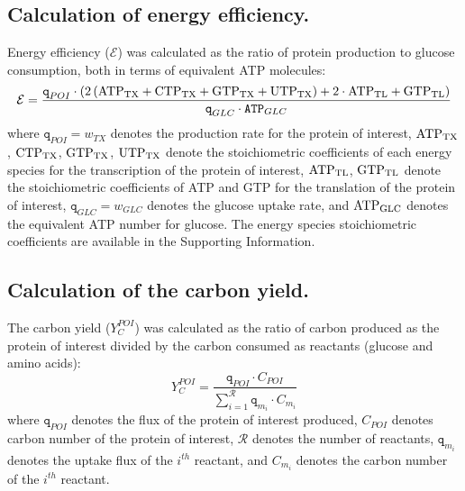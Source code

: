 \documentclass[journal=asbcd6,manuscript=article]{achemso}
\begin{document}
\clearpage

\subsection*{Calculation of energy efficiency.}
Energy efficiency ($\mathcal{E}$) was calculated as the ratio of protein production to glucose consumption, both in terms of equivalent ATP molecules:
\begin{equation}\label{eqn:energy-efficiency-definition}
	\mathcal{E}=\frac{\texttt{q}_{POI}\cdot \left(2\left(\rm {ATP}_{TX}+\rm {CTP}_{TX}+\rm {GTP}_{TX}+\rm {UTP}_{TX}\right)+\rm2\cdot\rm {ATP}_{TL}+\rm {GTP}_{TL}\right)}{\texttt{q}_{GLC}\cdot\texttt{ATP}_{GLC}}
\end{equation}
where $\texttt{q}_{POI}=w_{TX}$ denotes the production rate for the protein of interest, $\rm {ATP}_{TX}$, $\rm {CTP}_{TX}$, $\rm {GTP}_{TX}$, $\rm {UTP}_{TX}$ denote the stoichiometric coefficients of each energy species for the transcription of the protein of interest, $\rm {ATP}_{TL}$, $\rm {GTP}_{TL}$ denote the stoichiometric coefficients of ATP and GTP for the translation of the protein of interest, $\texttt{q}_{GLC}=w_{GLC}$ denotes the glucose uptake rate, and $\rm {ATP}_{GLC}$ denotes the equivalent ATP number for glucose.
The energy species stoichiometric coefficients are available in the Supporting Information.

\subsection*{Calculation of the carbon yield.}
The carbon yield ($Y_{C}^{POI}$) was calculated as the ratio of carbon produced as the protein of interest divided by the carbon consumed as reactants (glucose and amino acids):
\begin{equation}\label{eqn:yield-definition}
	Y_{C}^{POI}=\frac{\texttt{q}_{POI}\cdot C_{POI}}{\displaystyle\sum_{i=1}^{\mathcal{R}} \texttt{q}_{m_{i}}\cdot C_{m_i}}
\end{equation}
where $\texttt{q}_{POI}$ denotes the flux of the protein of interest produced, $C_{POI}$ denotes carbon number of the protein of interest, $\mathcal{R}$ denotes the number of reactants,
$\texttt{q}_{m_{i}}$ denotes the uptake flux of the $i^{th}$ reactant, and $C_{m_i}$ denotes the carbon number of the $i^{th}$ reactant.
\end{document}

